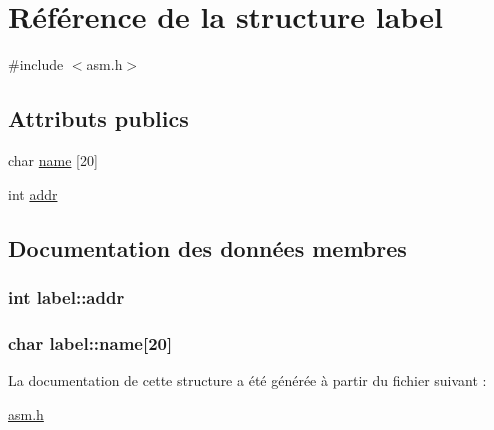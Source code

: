 \hypertarget{structlabel}{\section{Référence de la structure label}
\label{structlabel}
}


{\ttfamily \#include $<$asm.\-h$>$}

\subsection*{Attributs publics}
\begin{DoxyCompactItemize}
\item 
char \hyperlink{structlabel_a5d103d435b417fa98ffa2f235f46846e}{name} \mbox{[}20\mbox{]}
\item 
int \hyperlink{structlabel_af670c52b4f6b3aeaadc0ec95334e6e52}{addr}
\end{DoxyCompactItemize}


\subsection{Documentation des données membres}
\hypertarget{structlabel_af670c52b4f6b3aeaadc0ec95334e6e52}{
\subsubsection[{addr}]{\setlength{\rightskip}{0pt plus 5cm}int label\-::addr}}\label{structlabel_af670c52b4f6b3aeaadc0ec95334e6e52}
\hypertarget{structlabel_a5d103d435b417fa98ffa2f235f46846e}{
\subsubsection[{name}]{\setlength{\rightskip}{0pt plus 5cm}char label\-::name\mbox{[}20\mbox{]}}}\label{structlabel_a5d103d435b417fa98ffa2f235f46846e}


La documentation de cette structure a été générée à partir du fichier suivant \-:\begin{DoxyCompactItemize}
\item 
\hyperlink{asm_8h}{asm.\-h}\end{DoxyCompactItemize}
